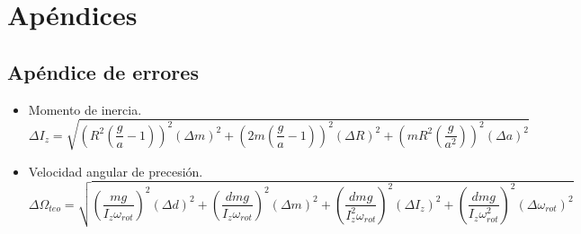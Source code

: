 \documentclass[a4paper]{article}
\begin{document}
\section*{Apéndices}
\subsection*{Apéndice de errores}
\begin{itemize}
\item Momento de inercia.
\begin{equation}
\Delta I_z=\sqrt{\left(R^2\left(\frac{g}{a}-1\right)\right)^2\left(\Delta m\right)^2+\left(2m\left(\frac{g}{a}-1\right)\right)^2 \left(\Delta R\right)^2+\left(mR^2\left(\frac{g}{a^2}\right)\right)^2\left(\Delta a\right)^2}
\end{equation}
\item Velocidad angular de precesión.
\begin{equation}
\Delta\Omega_{teo}=\sqrt{\left(\frac{mg}{I_z\omega_{rot}}\right)^2\left(\Delta d\right)^2+\left(\frac{dmg}{I_z\omega_{rot}}\right)^2\left(\Delta m\right)^2+\left(\frac{dmg}{I^2_z\omega_{rot}}\right)^2 \left(\Delta I_z\right)^2+\left(\frac{dmg}{I_z \omega^2_{rot}}\right)^2\left(\Delta \omega_{rot}\right)^2}
\end{equation}

\end{itemize}
\nocite{*}


\end{document}
